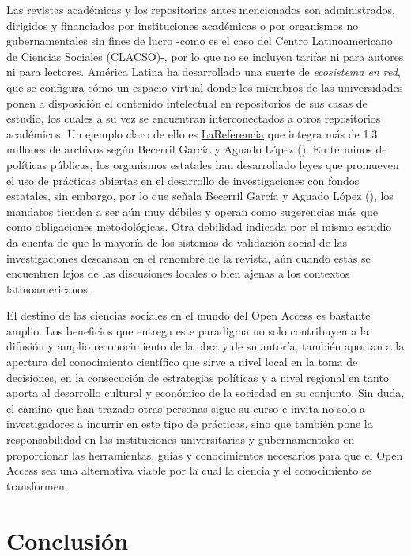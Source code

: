 \documentclass[
  spanish,
  a4paper,
  oneside]{scrbook}
\begin{document}
Las revistas académicas y los repositorios antes mencionados son
administrados, dirigidos y financiados por instituciones académicas o
por organismos no gubernamentales sin fines de lucro -como es el caso
del Centro Latinoamericano de Ciencias Sociales (CLACSO)-, por lo que no
se incluyen tarifas ni para autores ni para lectores. América Latina ha
desarrollado una suerte de \emph{ecosistema en red}, que se configura
cómo un espacio virtual donde los miembros de las universidades ponen a
disposición el contenido intelectual en repositorios de sus casas de
estudio, los cuales a su vez se encuentran interconectados a otros
repositorios académicos. Un ejemplo claro de ello es
\href{https://www.lareferencia.info/es/}{LaReferencia} que integra más
de 1.3 millones de archivos según Becerril García y Aguado López
(). En términos de políticas
públicas, los organismos estatales han desarrollado leyes que promueven
el uso de prácticas abiertas en el desarrollo de investigaciones con
fondos estatales, sin embargo, por lo que señala Becerril García y
Aguado López (), los
mandatos tienden a ser aún muy débiles y operan como sugerencias más que
como obligaciones metodológicas. Otra debilidad indicada por el mismo
estudio da cuenta de que la mayoría de los sistemas de validación social
de las investigaciones descansan en el renombre de la revista, aún
cuando estas se encuentren lejos de las discusiones locales o bien
ajenas a los contextos latinoamericanos.

El destino de las ciencias sociales en el mundo del Open Access es
bastante amplio. Los beneficios que entrega este paradigma no solo
contribuyen a la difusión y amplio reconocimiento de la obra y de su
autoría, también aportan a la apertura del conocimiento científico que
sirve a nivel local en la toma de decisiones, en la consecución de
estrategias políticas y a nivel regional en tanto aporta al desarrollo
cultural y económico de la sociedad en su conjunto. Sin duda, el camino
que han trazado otras personas sigue su curso e invita no solo a
investigadores a incurrir en este tipo de prácticas, sino que también
pone la responsabilidad en las instituciones universitarias y
gubernamentales en proporcionar las herramientas, guías y conocimientos
necesarios para que el Open Access sea una alternativa viable por la
cual la ciencia y el conocimiento se transformen.


\chapter{Conclusión}\label{conclusiuxf3n}
\end{document}
